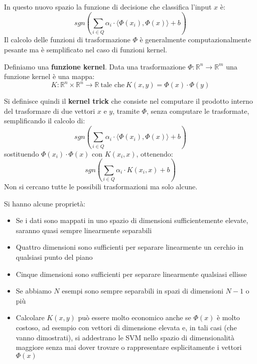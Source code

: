 In questo nuovo spazio la funzione di decisione che classifica l'input $x$ è:
\begin{equation}
    sgn\left(\sum_{i \in Q} \alpha_i \cdot \langle \Phi(x_i), \Phi(x)\rangle + b \right)
\end{equation}
Il calcolo delle funzioni di trasformazione $\Phi$ è generalmente computazionalmente pesante ma è semplificato nel caso di funzioni kernel.
\begin{definizione}
    Definiamo una \textbf{funzione kernel}. Data una trasformazione $\Phi: \mathbb{R}^n \to \mathbb{R}^m$ una funzione kernel è una mappa:
    \begin{equation}
       K: \mathbb{R}^n \times \mathbb{R}^n \to \mathbb{R} \ \text{tale che} \  K(x, y) = \Phi(x) \cdot \Phi(y)
    \end{equation}
\end{definizione}
\begin{definizione}
    Si definisce quindi il \textbf{kernel trick} che consiste nel computare il prodotto interno del trasformare di due vettori $x$ e $y$, tramite $\Phi$, senza computare le trasformate, semplificando il calcolo di:
    \begin{equation}
        sgn\left(\sum_{i \in Q} \alpha_i \cdot \langle \Phi(x_i), \Phi(x)\rangle + b \right)
    \end{equation}
    sostituendo $\Phi(x_i) \cdot \Phi(x)$ con $K(x_i, x)$, ottenendo:
    \begin{equation}
        sgn\left(\sum_{i \in Q} \alpha_i \cdot K(x_i, x) + b \right)
    \end{equation}
    Non si cercano tutte le possibili trasformazioni ma solo alcune.
\end{definizione}
Si hanno alcune proprietà:
\begin{itemize}
    \item Se i dati sono mappati in uno spazio di dimensioni sufficientemente elevate, saranno quasi sempre linearmente separabili
    \item Quattro dimensioni sono sufficienti per separare linearmente un cerchio in qualsiasi punto del piano
    \item Cinque dimensioni sono sufficienti per separare linearmente qualsiasi ellisse
    \item Se abbiamo $N$ esempi sono sempre separabili in spazi di dimensioni $N - 1$ o più
    \item Calcolare $K(x, y)$ può essere molto economico anche se $\Phi(x)$ è molto costoso, ad esempio con vettori di dimensione elevata e, in tali casi (che vanno dimostrati), si addestrano le SVM nello spazio di dimensionalità maggiore senza mai dover trovare o rappresentare esplicitamente i vettori $\Phi(x)$
\end{itemize}

